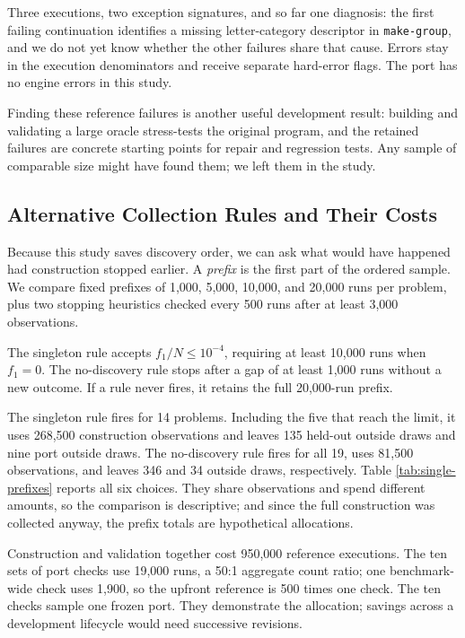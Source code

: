\documentclass[10pt,letterpaper]{article}
\begin{document}
Three executions, two exception signatures, and so far one diagnosis: the first failing
continuation identifies a missing letter-category descriptor in \texttt{make-group}, and
we do not yet know whether the other failures share that cause. Errors stay in the
execution denominators and receive separate hard-error flags. The port has no engine
errors in this study.

Finding these reference failures is another useful development result: building and
validating a large oracle stress-tests the original program, and the retained failures are
concrete starting points for repair and regression tests. Any sample of comparable size
might have found them; we left them in the study.

\subsection{Alternative Collection Rules and Their Costs}\label{sec:single-cost}

Because this study saves discovery order, we can ask what would have happened had
construction stopped earlier. A \emph{prefix} is the first part of the ordered sample. We
compare fixed prefixes of 1,000, 5,000, 10,000, and 20,000 runs per problem, plus two
stopping heuristics checked every 500 runs after at least 3,000 observations.

The singleton rule accepts \(f_1/N\le10^{-4}\), requiring at least 10,000 runs when
\(f_1=0\). The no-discovery rule stops after a gap of at least 1,000 runs without a new
outcome. If a rule never fires, it retains the full 20,000-run prefix.

The singleton rule fires for 14 problems. Including the five that reach the limit, it uses
268,500 construction observations and leaves 135 held-out outside draws and nine port
outside draws. The no-discovery rule fires for all 19, uses 81,500 observations, and
leaves 346 and 34 outside draws, respectively. Table \ref{tab:single-prefixes} reports all
six choices. They share observations and spend different amounts, so the comparison is
descriptive; and since the full construction was collected anyway, the prefix totals are
hypothetical allocations.

Construction and validation together cost 950,000 reference executions. The ten sets of
port checks use 19,000 runs, a 50:1 aggregate count ratio; one benchmark-wide check uses
1,900, so the upfront reference is 500 times one check. The ten checks sample one frozen
port. They demonstrate the allocation; savings across a development lifecycle would need
successive revisions.
\end{document}
